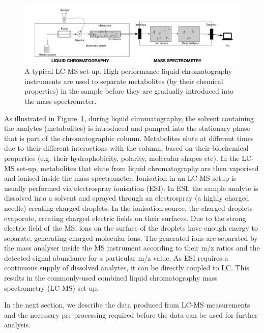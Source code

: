 \begin{figure}
\noindent \begin{centering}
\includegraphics[width=1.0\textwidth]{02-background/figures/LCMS}
\par\end{centering}
\caption[A typical LC-MS set-up.]{\label{fig:LC-MS-setup}A typical LC-MS set-up. High performance liquid chromatography instruments are used to separate metabolites (by their chemical properties) in the sample before they are gradually introduced into the mass spectrometer.}
\end{figure}

As illustrated in Figure~\ref{fig:LC-MS-setup}, during liquid chromatography, the solvent containing the analytes (metabolites) is introduced and pumped into the stationary phase that is part of the chromatographic column. Metabolites elute at different times due to their different interactions with the column, based on their biochemical properties (e.g. their hydrophobicity, polarity, molecular shapes etc). In the LC-MS set-up, metabolites that elute from liquid chromatography are then vaporised and ionised inside the mass spectrometer. Ionisation in an LC-MS setup is usually performed via electrospray ionisation (ESI). In ESI, the sample analyte is dissolved into a solvent and sprayed through an electrospray (a highly charged needle) creating charged droplets. In the ionisation source, the charged droplets evaporate, creating charged electric fields on their surfaces. Due to the strong electric field of the MS, ions on the surface of the droplets have enough energy to separate, generating charged molecular ions. The generated ions are separated by the mass analyser inside the MS instrument according to their m/z ratios and the detected signal abundance for a particular m/z value. As ESI requires a continuous supply of dissolved analytes, it can be directly coupled to LC. This results in the commonly-used combined liquid chromatography mass spectrometry (LC-MS) set-up. 

In the next section, we describe the data produced from LC-MS measurements and the necessary pre-processing required before the data can be used for further analysis.

